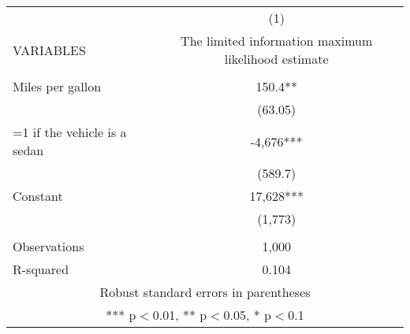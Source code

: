 \begin{tabular}{lc} \hline
 & (1) \\
VARIABLES & The limited information maximum likelihood estimate \\ \hline
 &  \\
Miles per gallon & 150.4** \\
 & (63.05) \\
=1 if the vehicle is a sedan & -4,676*** \\
 & (589.7) \\
Constant & 17,628*** \\
 & (1,773) \\
 &  \\
Observations & 1,000 \\
 R-squared & 0.104 \\ \hline
\multicolumn{2}{c}{ Robust standard errors in parentheses} \\
\multicolumn{2}{c}{ *** p$<$0.01, ** p$<$0.05, * p$<$0.1} \\
\end{tabular}

